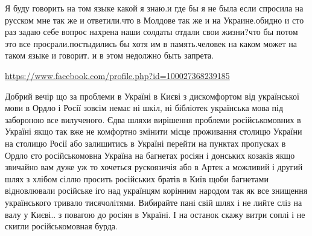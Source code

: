 
Я буду говорить на том языке какой я знаю.и где бы я не была если спросила на
русском мне так же и ответили.что в Молдове так же и на Украине.обидно и сто
раз задаю себе вопрос нахрена наши солдаты отдали свои жизни?что бы потом это
все просрали.постыдились бы хотя им в память.человек на каком может на таком
языке и говорит. и в этом недолжно быть запрета.

\url{https://www.facebook.com/profile.php?id=100027368239185}

Добрий вечір що за проблеми в Україні в Києві з дискомфортом від української
мови в Ордло і Росії зовсім немає ні шкіл, ні бібліотек українська мова під
забороною все вилученого. Єдва шляхи вирішення проблеми російськомовних в
Україні якщо так вже не комфортно змінити місце проживання столицю України на
столицю Росії або залишитись в Україні перейти на пунктах пропусках в Ордло єто
російськомовна Україна на багнетах росіян і донських козаків якщо звичайно вам
дуже уж то хочеться рускоязичія або в Артек а можливий і другий шлях з хлібом
сіллю просить російських братів в Київ щоби багнетами відновлювали російське
іго над українцям корінним народом так як все знищення українського тривало
тисячолітями. Вибирайте пані свій шлях і не лийте сліз на валу у Києві.. з
повагою до росіян в Україні. І на останок скажу витри соплі і не скигли
російськомовная бурда.


